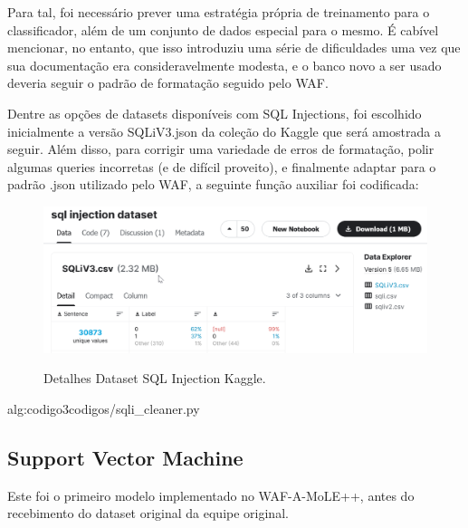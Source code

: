 Para tal, foi necessário prever uma estratégia própria de treinamento para o classificador, além de um conjunto de dados especial para o mesmo. É cabível mencionar, no entanto, que isso introduziu uma série de dificuldades uma vez que sua documentação era consideravelmente modesta, e o banco novo a ser usado deveria seguir o padrão de formatação seguido pelo WAF.

Dentre as opções de datasets disponíveis com SQL Injections, foi escolhido inicialmente a versão SQLiV3.json da coleção do Kaggle que será amostrada a seguir.
Além disso, para corrigir uma variedade de erros de formatação, polir algumas queries incorretas (e de difícil proveito), e finalmente adaptar para o padrão .json utilizado pelo WAF, a seguinte função auxiliar foi codificada:

\begin{figure}[ht]
    \centering
    \caption{Detalhes Dataset SQL Injection Kaggle.}
    \includegraphics[width=16cm]{figuras/sqlInjectionDataset.png} 
    \label{fig:internet} 
\end{figure}

\label{sec:codigos}
 {alg:codigo3}{codigos/sqli_cleaner.py}

\subsection{Support Vector Machine}
Este foi o primeiro modelo implementado no WAF-A-MoLE++, antes do recebimento do dataset original da equipe original. 





